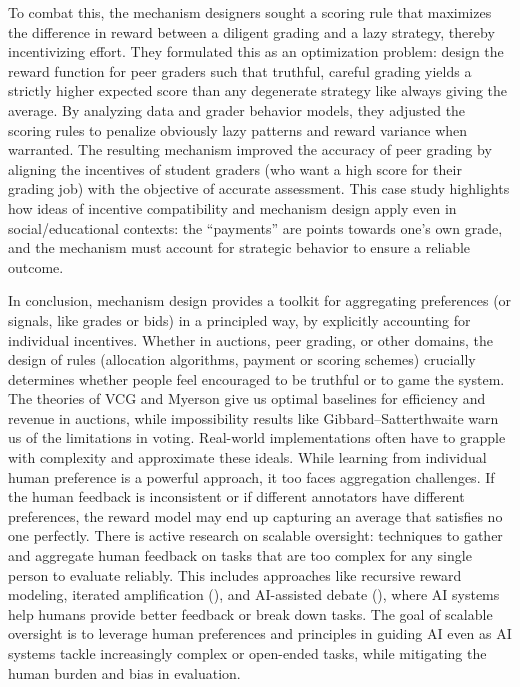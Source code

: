 \documentclass[
  letterpaper,
  numbers=noenddot,
  DIV=11]{scrreprt}
\theoremstyle{plain}
\theoremstyle{definition}
\theoremstyle{remark}
\begin{document}
To combat this, the mechanism designers sought a scoring rule that
maximizes the difference in reward between a diligent grading and a lazy
strategy, thereby incentivizing effort. They formulated this as an
optimization problem: design the reward function for peer graders such
that truthful, careful grading yields a strictly higher expected score
than any degenerate strategy like always giving the average. By
analyzing data and grader behavior models, they adjusted the scoring
rules to penalize obviously lazy patterns and reward variance when
warranted. The resulting mechanism improved the accuracy of peer grading
by aligning the incentives of student graders (who want a high score for
their grading job) with the objective of accurate assessment. This case
study highlights how ideas of incentive compatibility and mechanism
design apply even in social/educational contexts: the ``payments'' are
points towards one's own grade, and the mechanism must account for
strategic behavior to ensure a reliable outcome.

In conclusion, mechanism design provides a toolkit for aggregating
preferences (or signals, like grades or bids) in a principled way, by
explicitly accounting for individual incentives. Whether in auctions,
peer grading, or other domains, the design of rules (allocation
algorithms, payment or scoring schemes) crucially determines whether
people feel encouraged to be truthful or to game the system. The
theories of VCG and Myerson give us optimal baselines for efficiency and
revenue in auctions, while impossibility results like
Gibbard--Satterthwaite warn us of the limitations in voting. Real-world
implementations often have to grapple with complexity and approximate
these ideals. While learning from individual human preference is a
powerful approach, it too faces aggregation challenges. If the human
feedback is inconsistent or if different annotators have different
preferences, the reward model may end up capturing an average that
satisfies no one perfectly. There is active research on scalable
oversight: techniques to gather and aggregate human feedback on tasks
that are too complex for any single person to evaluate reliably. This
includes approaches like recursive reward modeling, iterated
amplification (), and AI-assisted debate
(),
where AI systems help humans provide better feedback or break down
tasks. The goal of scalable oversight is to leverage human preferences
and principles in guiding AI even as AI systems tackle increasingly
complex or open-ended tasks, while mitigating the human burden and bias
in evaluation.
\end{document}
